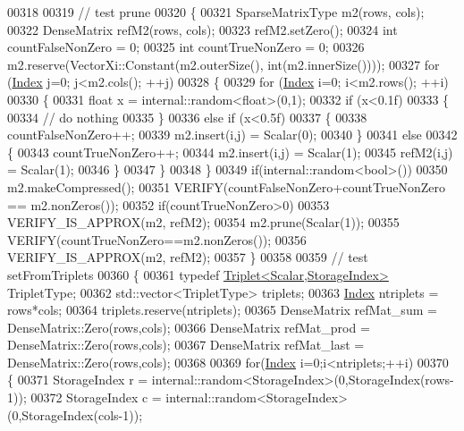 \begin{DoxyCode}
00318 
00319   \textcolor{comment}{// test prune}
00320   \{
00321     SparseMatrixType m2(rows, cols);
00322     DenseMatrix refM2(rows, cols);
00323     refM2.setZero();
00324     \textcolor{keywordtype}{int} countFalseNonZero = 0;
00325     \textcolor{keywordtype}{int} countTrueNonZero = 0;
00326     m2.reserve(VectorXi::Constant(m2.outerSize(), int(m2.innerSize())));
00327     \textcolor{keywordflow}{for} (\hyperlink{namespace_eigen_a62e77e0933482dafde8fe197d9a2cfde}{Index} j=0; j<m2.cols(); ++j)
00328     \{
00329       \textcolor{keywordflow}{for} (\hyperlink{namespace_eigen_a62e77e0933482dafde8fe197d9a2cfde}{Index} i=0; i<m2.rows(); ++i)
00330       \{
00331         \textcolor{keywordtype}{float} x = internal::random<float>(0,1);
00332         \textcolor{keywordflow}{if} (x<0.1f)
00333         \{
00334           \textcolor{comment}{// do nothing}
00335         \}
00336         \textcolor{keywordflow}{else} \textcolor{keywordflow}{if} (x<0.5f)
00337         \{
00338           countFalseNonZero++;
00339           m2.insert(i,j) = Scalar(0);
00340         \}
00341         \textcolor{keywordflow}{else}
00342         \{
00343           countTrueNonZero++;
00344           m2.insert(i,j) = Scalar(1);
00345           refM2(i,j) = Scalar(1);
00346         \}
00347       \}
00348     \}
00349     \textcolor{keywordflow}{if}(internal::random<bool>())
00350       m2.makeCompressed();
00351     VERIFY(countFalseNonZero+countTrueNonZero == m2.nonZeros());
00352     \textcolor{keywordflow}{if}(countTrueNonZero>0)
00353       VERIFY\_IS\_APPROX(m2, refM2);
00354     m2.prune(Scalar(1));
00355     VERIFY(countTrueNonZero==m2.nonZeros());
00356     VERIFY\_IS\_APPROX(m2, refM2);
00357   \}
00358 
00359   \textcolor{comment}{// test setFromTriplets}
00360   \{
00361     \textcolor{keyword}{typedef} \hyperlink{group___sparse_core___module_class_eigen_1_1_triplet}{Triplet<Scalar,StorageIndex>} TripletType;
00362     std::vector<TripletType> triplets;
00363     \hyperlink{namespace_eigen_a62e77e0933482dafde8fe197d9a2cfde}{Index} ntriplets = rows*cols;
00364     triplets.reserve(ntriplets);
00365     DenseMatrix refMat\_sum  = DenseMatrix::Zero(rows,cols);
00366     DenseMatrix refMat\_prod = DenseMatrix::Zero(rows,cols);
00367     DenseMatrix refMat\_last = DenseMatrix::Zero(rows,cols);
00368 
00369     \textcolor{keywordflow}{for}(\hyperlink{namespace_eigen_a62e77e0933482dafde8fe197d9a2cfde}{Index} i=0;i<ntriplets;++i)
00370     \{
00371       StorageIndex r = internal::random<StorageIndex>(0,StorageIndex(rows-1));
00372       StorageIndex c = internal::random<StorageIndex>(0,StorageIndex(cols-1));

\end{DoxyCode}
